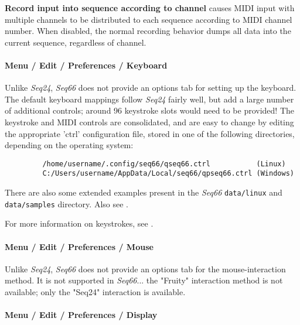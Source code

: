    \textbf{Record input into sequence according to channel}
   causes MIDI input with multiple channels to be distributed to
   each sequence according to MIDI channel number.
   When disabled, the normal recording behavior dumps all data into the current
   sequence, regardless of channel.

\paragraph{Menu / Edit / Preferences / Keyboard}
\label{paragraph:menu_edit_preferences_keyboard}

   Unlike \textsl{Seq24}, \textsl{Seq66} does not provide an options tab for
   setting up the keyboard.
   The default keyboard mappings follow \textsl{Seq24} fairly well,
   but add a large number of additional controls;
   around 96 keystroke slots would need to be provided!
   The keystroke and MIDI controls are consolidated, and are easy to change by
   editing the appropriate 'ctrl' configuration file, stored in one of the
   following directories, depending on
   the operating system:
   
   \begin{verbatim}
         /home/username/.config/seq66/qseq66.ctrl           (Linux)
         C:/Users/username/AppData/Local/seq66/qpseq66.ctrl (Windows)
   \end{verbatim}

   There are also some extended examples present in the \textsl{Seq66}
   \texttt{data/linux} and
   \texttt{data/samples} directory.
   Also see .

   For more information on keystrokes, see
   .

\paragraph{Menu / Edit / Preferences / Mouse}
\label{paragraph:menu_edit_preferences_mouse}

   Unlike \textsl{Seq24}, \textsl{Seq66} does not provide an options tab for
   the mouse-interaction method.
   It is not supported in \textsl{Seq66}...
   the "Fruity" interaction method is not available;
   only the "Seq24" interaction is available.
 
\paragraph{Menu / Edit / Preferences / Display}
\label{paragraph:menu_edit_preferences_display}

